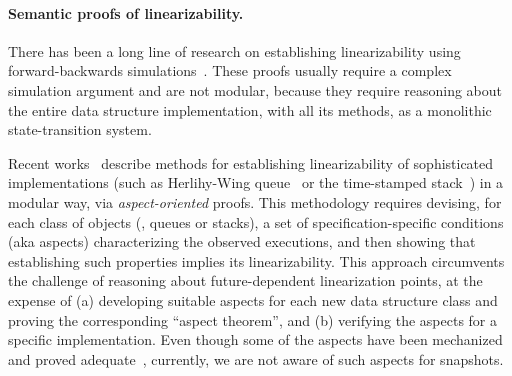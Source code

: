 
\paragraph{Semantic proofs of linearizability.}
\label{sec:semant-proofs-line}

There has been a long line of research on establishing linearizability
using forward-backwards
simulations~\cite{SchellhornWD+CAV12,ColvinGLM06,ColvinDG05}. These
proofs usually require a complex simulation argument and are not
modular, because they require reasoning about the entire data structure
implementation, with all its methods, as a monolithic
state-transition system.

Recent works~\cite{HenzingerSV+CONCUR13, ChakrabortyHSV+LMCS15,
  DoddsHK+POPL15} describe methods for establishing linearizability of
sophisticated implementations (such as Herlihy-Wing
queue~\cite{HerlihyW+TOPLAS90} or the time-stamped
stack~\cite{DoddsHK+POPL15}) in a modular way, via
\emph{aspect-oriented} proofs.
%
This methodology requires devising, for each class of objects (\eg,
queues or stacks), a set of specification-specific conditions (aka
aspects) characterizing the observed executions, and then showing that
establishing such properties implies its linearizability.
%
This approach circumvents the challenge of reasoning about
future-dependent linearization points, at the expense of (a)
developing suitable aspects for each new data structure class and
proving the corresponding ``aspect theorem'', and (b) verifying the
aspects for a specific implementation. 
%
%
Even though some of the aspects have been mechanized and proved
adequate~\cite{DoddsHK+POPL15}, 
%
currently, we are not aware of such aspects for snapshots.


%

